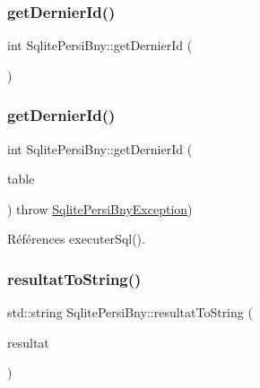 \mbox{\label{classSqlitePersiBny_a44284ce3b32df4a0f2c0f053323cc4b9}} 
\subsubsection{\texorpdfstring{get\+Dernier\+Id()}{getDernierId()}\hspace{0.1cm}{\footnotesize\ttfamily [1/2]}}
{\footnotesize\ttfamily int Sqlite\+Persi\+Bny\+::get\+Dernier\+Id (\begin{DoxyParamCaption}{ }\end{DoxyParamCaption})}

\mbox{\label{classSqlitePersiBny_a3f6a2b7a50d826cc030ac60aadf54d8f}} 
\subsubsection{\texorpdfstring{get\+Dernier\+Id()}{getDernierId()}\hspace{0.1cm}{\footnotesize\ttfamily [2/2]}}
{\footnotesize\ttfamily int Sqlite\+Persi\+Bny\+::get\+Dernier\+Id (\begin{DoxyParamCaption}\item[{std\+::string}]{table }\end{DoxyParamCaption}) throw  \hyperlink{classSqlitePersiBnyException}{Sqlite\+Persi\+Bny\+Exception}) }



Références executer\+Sql().

\mbox{\label{classSqlitePersiBny_a6c80449c682a18e9e9ce0a860f05088d}} 
\subsubsection{\texorpdfstring{resultat\+To\+String()}{resultatToString()}}
{\footnotesize\ttfamily std\+::string Sqlite\+Persi\+Bny\+::resultat\+To\+String (\begin{DoxyParamCaption}\item[{\hyperlink{classSqlitePersiBny_a04bdd1bacd9241210ea44ec2c072f79b}{Sqlite\+Persi\+Bny\+::\+Resultat} \&}]{resultat }\end{DoxyParamCaption})\hspace{0.3cm}{\ttfamily [static]}}



